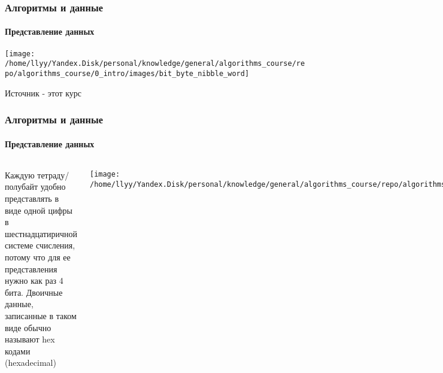 \documentclass[aspectratio=169]{beamer}
\begin{document}
\begin{frame}
\frametitle{Алгоритмы и данные}
\framesubtitle{Представление данных}
\justifying
\small
\centering
\texttt{[image: /home/llyy/Yandex.Disk/personal/knowledge/general/algorithms\_course/repo/algorithms\_course/0\_intro/images/bit\_byte\_nibble\_word]}

\scriptsize Источник - этот курс

\end{frame}

\begin{frame}
\frametitle{Алгоритмы и данные}
\framesubtitle{Представление данных}
\justifying
\begin{block}{}
\begin{columns}[]
\column{\dimexpr\linewidth-40mm}
\justifying
\small
Каждую тетраду/полубайт удобно представлять в виде одной цифры в шестнадцатиричной системе счисления, потому что для ее представления 
нужно как раз 4 бита. Двоичные данные, записанные в таком виде обычно называют hex кодами (hexadecimal)\newline

\centering
\texttt{[image: /home/llyy/Yandex.Disk/personal/knowledge/general/algorithms\_course/repo/algorithms\_course/0\_intro/images/hex\_to\_bin\_conversion]}
\centering

\column{40mm}

\texttt{[image: /home/llyy/Yandex.Disk/personal/knowledge/general/algorithms\_course/repo/algorithms\_course/0\_intro/images/hex\_digits]}
\centering

\end{columns}
\end{block}
\end{frame}
\end{document}
